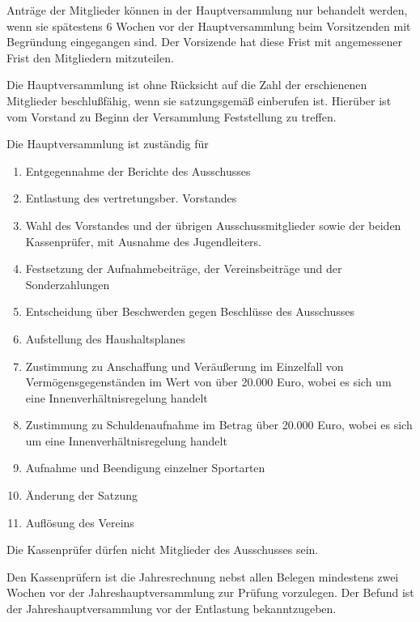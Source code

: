 \documentclass[10pt,a4paper,parskip=half]{scrartcl}
\begin{document}
\begin{contract}
\begin{multicols}{2}
\begin{enumerate}[label=\alph*),noitemsep]
\begin{enumerate}[label=\alph*),noitemsep]
    Anträge der Mitglieder können in der Haupt\-ver\-samm\-lung nur behandelt werden,
    wenn sie spätestens 6 Wochen vor der Hauptversammlung beim Vorsitzenden mit Begründung eingegangen sind.
    Der Vorsizende hat diese Frist mit angemessener Frist den Mitgliedern mitzuteilen.
    
    Die Hauptversammlung ist ohne Rücksicht auf die Zahl der erschienenen Mitglieder beschlußfähig,
    wenn sie satzungsgemäß einberufen ist.
    Hierüber ist vom Vorstand zu Beginn der Versammlung Feststellung zu treffen.
    
    Die Hauptversammlung ist zuständig für
    \begin{enumerate}[label=\alph*),noitemsep]
      \item Entgegennahme der Berichte des Ausschusses
      \item Entlastung des vertretungsber. Vorstandes %
      \item Wahl des Vorstandes und der übrigen Ausschussmitglieder sowie der beiden Kassenprüfer,
            mit Ausnahme des Jugendleiters.
      \item Festsetzung der Aufnahmebeiträge,
            der Vereinsbeiträge und der Sonderzahlungen
      \item Entscheidung über Beschwerden gegen Beschlüsse des Ausschusses
      \item Aufstellung des Haushaltsplanes
      \item Zustimmung zu Anschaffung und Veräußerung im Einzelfall von Vermögensgegenständen im Wert von über 20.000 Euro,
            wobei es sich um eine Innenverhältnisregelung handelt
      \item Zustimmung zu Schuldenaufnahme im Betrag über 20.000 Euro,
            wobei es sich um eine Innenverhältnisregelung handelt
      \item Aufnahme und Beendigung einzelner Sportarten
      \item Änderung der Satzung
      \item Auflösung des Vereins
    \end{enumerate}
    
    Die Kassenprüfer dürfen nicht Mitglieder des Ausschusses sein.
    
    Den Kassenprüfern ist die Jahresrechnung nebst allen Belegen mindestens zwei Wochen vor der Jahreshauptversammlung zur Prüfung vorzulegen. 
    Der Befund ist der Jahreshauptversammlung vor der Entlastung bekanntzugeben.
    

\end{enumerate}
\end{enumerate}
\end{multicols}
\end{contract}
\end{document}
